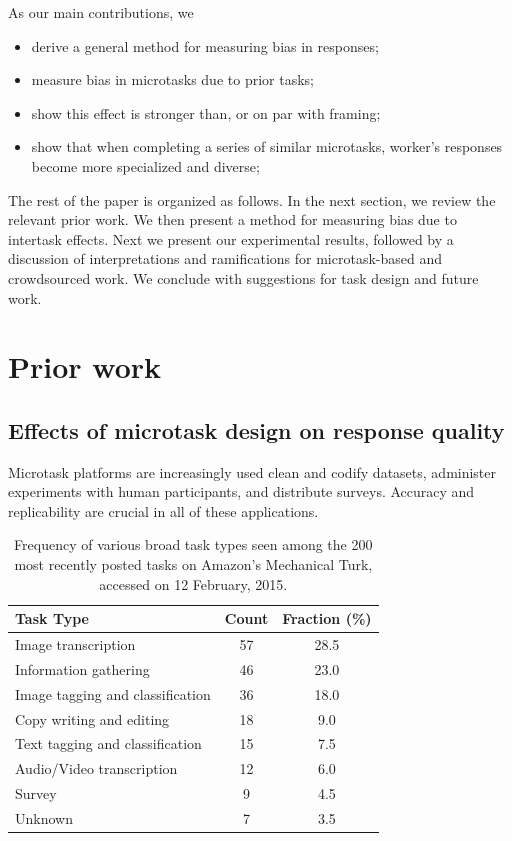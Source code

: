 \documentclass{sigchi}
\begin{document}
As our main contributions, we
\begin{itemize}[noitemsep,nolistsep]
  \item{derive a general method for measuring bias in responses;}
  \item{measure bias in microtasks due to prior tasks;}
  \item{show this effect is stronger than, or on par with framing;}
  \item{
	show that when completing a series of similar microtasks,
	worker's responses become more specialized and diverse;
  }
\end{itemize}

The rest of the paper is organized as follows.  In the next section, we 
review the relevant prior work.  We then present a method for 
measuring bias due to intertask effects.  
Next we present our experimental results, followed by a discussion 
of interpretations and ramifications for microtask-based and crowdsourced 
work.  We conclude with suggestions for task design and future work.

\section{Prior work}
\subsection{Effects of microtask design on response quality}
Microtask platforms are increasingly used clean and codify datasets,
administer experiments with human participants, and distribute 
surveys.  Accuracy and replicability are crucial in all of these 
applications.

\begin{table}
\centering
\begin{tabular}{l c c}
\toprule
Task Type & Count & Fraction (\%) \\
\toprule
Image transcription & 57 & 28.5 \\
Information gathering & 46 & 23.0 \\
Image tagging and classification & 36 & 18.0 \\
Copy writing and editing & 18 & 9.0 \\
Text tagging and classification & 15 & 7.5 \\
Audio/Video transcription & 12 & 6.0 \\
Survey & 9 & 4.5 \\
Unknown & 7 & 3.5 \\
\bottomrule
\end{tabular}
\caption{
	Frequency of various broad task types seen among the 200 most 
	recently posted tasks on Amazon's Mechanical Turk, 
	accessed on 12 February, 2015.
}
\label{table:task_composition}
\end{table}
\end{document}
